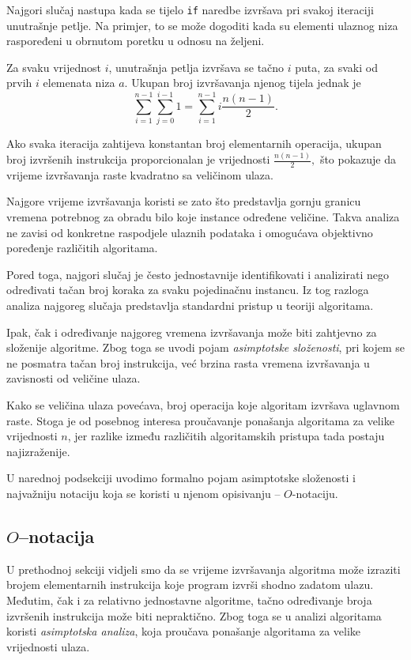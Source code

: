 Najgori slučaj nastupa kada se tijelo \texttt{if} naredbe izvršava pri svakoj iteraciji unutrašnje petlje. Na primjer, to se može dogoditi kada su elementi ulaznog niza raspoređeni u obrnutom poretku u odnosu na željeni.

Za svaku vrijednost $i$, unutrašnja petlja izvršava se tačno $i$ puta, za svaki od prvih $i$ elemenata niza $a$. Ukupan broj izvršavanja njenog tijela jednak je$$
\sum_{i=1}^{n-1}\sum_{j=0}^{i-1}1 = \sum_{i=1}^{n-1}i
\frac{n(n-1)}{2}.
$$

Ako svaka iteracija zahtijeva konstantan broj elementarnih operacija, ukupan broj izvršenih instrukcija proporcionalan je vrijednosti  $\frac{n(n-1)}{2}, $ što pokazuje da vrijeme izvršavanja raste kvadratno sa veličinom ulaza.

Najgore vrijeme izvršavanja koristi se zato što predstavlja gornju granicu vremena potrebnog za obradu bilo koje instance određene veličine. Takva analiza ne zavisi od konkretne raspodjele ulaznih podataka i omogućava objektivno poređenje različitih algoritama.

Pored toga, najgori slučaj je često jednostavnije identifikovati i analizirati nego određivati tačan broj koraka za svaku pojedinačnu instancu. Iz tog razloga analiza najgoreg slučaja predstavlja standardni pristup u teoriji algoritama.

Ipak, čak i određivanje najgoreg vremena izvršavanja može biti zahtjevno za složenije algoritme. Zbog toga se uvodi pojam \textit{asimptotske složenosti}, pri kojem se ne posmatra tačan broj instrukcija, već brzina rasta vremena izvršavanja u zavisnosti od veličine ulaza.

Kako se veličina ulaza povećava, broj operacija koje algoritam izvršava uglavnom raste. Stoga je od posebnog interesa proučavanje ponašanja algoritama za velike vrijednosti $n$, jer razlike između različitih algoritamskih pristupa tada postaju najizraženije.

U narednoj podsekciji uvodimo formalno pojam asimptotske složenosti i najvažniju notaciju koja se koristi u njenom opisivanju -- $O$-notaciju.

\subsection{$O$--notacija}

U prethodnoj sekciji vidjeli smo da se vrijeme izvršavanja algoritma može izraziti brojem elementarnih instrukcija koje program izvrši shodno zadatom ulazu. Međutim, čak i za relativno jednostavne algoritme, tačno određivanje broja izvršenih instrukcija može biti nepraktično. Zbog toga se u analizi algoritama koristi \textit{asimptotska analiza}, koja proučava ponašanje algoritama za velike vrijednosti ulaza.

